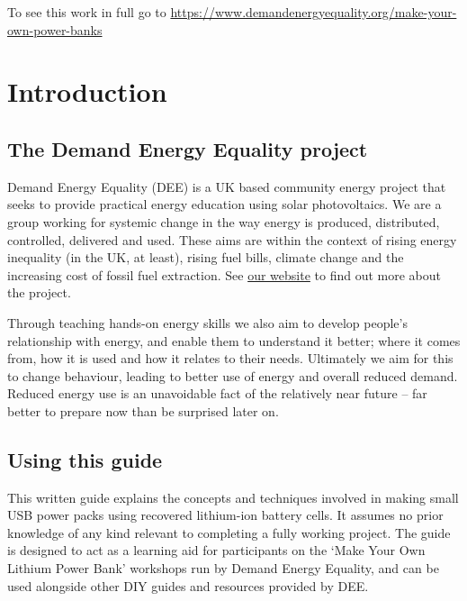 \documentclass{article}
\theoremstyle{definition}
\theoremstyle{definition}
\theoremstyle{remark}
\begin{document}
    To see this work in full go to \href{https://www.demandenergyequality.org/make-your-own-power-banks}{https://www.demandenergyequality.org/make-your-own-power-banks}
  


\newpage

\section{Introduction} %
\label{sec:introduction}

  \subsection{The Demand Energy Equality project} %
  \label{sub:the_demand_energy_equality_project}

    Demand Energy Equality (DEE) is a UK based community energy project that seeks to provide practical energy education using solar photovoltaics. We are a group working for systemic change in the way energy is produced, distributed, controlled, delivered and used. These aims are within the context of rising energy inequality (in the UK, at least), rising fuel bills, climate change and the increasing cost of fossil fuel extraction. See \href{https://www.demandenergyequality.org/about/}{our website} to find out more about the project.
    
    Through teaching hands-on energy skills we also aim to develop people’s relationship with energy, and enable them to understand it better; where it comes from, how it is used and how it relates to their needs. Ultimately we aim for this to change behaviour, leading to better use of energy and overall reduced demand. Reduced energy use is an unavoidable fact of the relatively near future – far better to prepare now than be surprised later on.
  
  
  \subsection{Using this guide} %
  \label{sub:using_this_guide}

    This written guide explains the concepts and techniques involved in making small USB power packs using recovered lithium-ion battery cells. It assumes no prior knowledge of any kind relevant to completing a fully working project. The guide is designed to act as a learning aid for participants on the ‘Make Your Own Lithium Power Bank’ workshops run by Demand Energy Equality, and can be used alongside other DIY guides and resources provided by DEE. 
    
\end{document}
